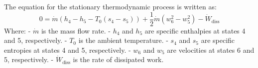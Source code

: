 The equation for the stationary thermodynamic process is written as:  
\[
0 = \dot{m} \left( h_4 - h_5 - T_0 (s_4 - s_5) \right) + \frac{1}{2} \dot{m} \left( w_6^2 - w_5^2 \right) - \dot{W}_{\text{diss}}
\]  
Where:  
- \( \dot{m} \) is the mass flow rate.  
- \( h_4 \) and \( h_5 \) are specific enthalpies at states 4 and 5, respectively.  
- \( T_0 \) is the ambient temperature.  
- \( s_4 \) and \( s_5 \) are specific entropies at states 4 and 5, respectively.  
- \( w_6 \) and \( w_5 \) are velocities at states 6 and 5, respectively.  
- \( \dot{W}_{\text{diss}} \) is the rate of dissipated work.